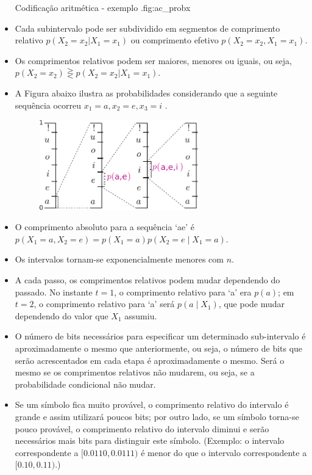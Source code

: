 \begin{frame}[allowframebreaks]
\begin{itemize}
	{Codificação aritmética - exemplo \citep{bilmes2013}.}{fig:ac_probx}
  \item Cada subintervalo pode ser subdividido em segmentos de comprimento relativo $p(X_2 = x_2 | X_1 = x_1)$ ou
	comprimento efetivo $p(X_2 = x_2, X_1 = x_1)$.
  \item Os comprimentos relativos podem ser maiores, menores ou iguais, ou seja, $p(X_2 = x_2) \gtreqless p(X_2 = x_2 | X_1 = x_1)$.
  \item A Figura abaixo ilustra as probabilidades considerando que a seguinte sequência ocorreu $x_1 = a, x_2 = e, x_3 = i$ \citep{bilmes2013}.
        \begin{figure}[h!]
        \centering
        \includegraphics[width=0.65\textwidth]{images/probxacoding.pdf}
        \label{fig:probxacoding}
        \end{figure}
  \item O comprimento absoluto para a sequência `ae' é $p(X_1 = a, X_2 = e) = p(X_1 = a) p(X_2 = e \mid X_1 = a)$.
  \item Os intervalos tornam-se exponencialmente menores com $n$.
  \item A cada passo, os comprimentos relativos podem mudar dependendo do passado.
	No instante $t=1$, o comprimento relativo para `a' era $p(a)$;
	em $t=2$, o comprimento relativo para `a' será $p(a \mid X_1)$, que pode
	mudar dependendo do valor que $X_1$ assumiu.
  \item O número de bits necessários para especificar um determinado sub-intervalo é
	aproximadamente o mesmo que anteriormente, ou seja, o número de bits que serão
	acrescentados em cada etapa é aproximadamente o mesmo. 
	Será o mesmo se os comprimentos relativos não mudarem, ou seja, se 
	a probabilidade condicional não mudar.
  \item Se um símbolo fica muito provável, o comprimento relativo do intervalo é grande
	e assim utilizará poucos bits; por outro lado, se um símbolo torna-se pouco provável,
	o comprimento relativo do intervalo diminui e serão necessários mais bits para 
	distinguir este símbolo. (Exemplo: o intervalo correspondente a $[0.0110,0.0111)$ é 
	menor do que o intervalo correspondente a $[0.10,0.11)$.)
  \end{itemize}


\end{frame}
